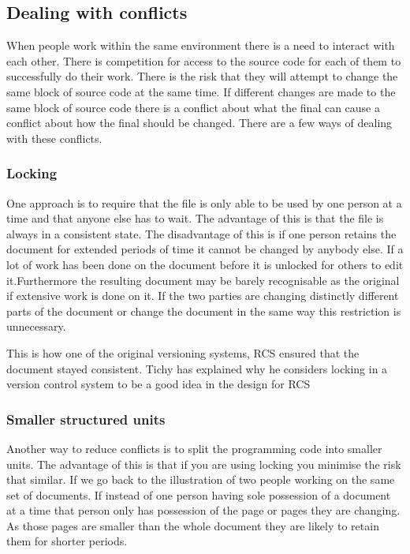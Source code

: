 \subsection{Dealing with conflicts}
When people work within the same environment there is a need to interact with each other.
There is competition for access to the source code for each of them to successfully do their work.
There is the risk that they will attempt to change the same block of source code at the same time.
If different changes are made to the same block of source code there is a conflict about what the final can cause a conflict about how the final should be changed.
There are a few ways of dealing with these conflicts.

\subsubsection{Locking}
One approach is to require that the file is only able to be used by one person at a time and that anyone else has to wait. The advantage of this is that the file is always in a consistent state. The disadvantage of this is if one person retains the document for extended periods of time it cannot be changed by anybody else. If a lot of work has been done on the document before it is unlocked for others to edit it.Furthermore the resulting document may be barely recognisable as the original if extensive work is done on it. If the two parties are changing distinctly different parts of the document or change the document in the same way this restriction is unnecessary.

This is how one of the original versioning systems, RCS ensured that the document stayed consistent. Tichy has explained why he considers locking in a version control system to be a good idea in the design for RCS\cite{Tichy1982}

\subsubsection{Smaller structured units}
Another way to reduce conflicts is to split the programming code into smaller units.  The advantage of this is that if you are using locking you minimise the risk that similar. If we go back to the illustration of two people working on the same set of documents.  If instead of one person having sole possession of a document at a time that person only has possession of the page or pages they are changing. As those pages are smaller than the whole document they are likely to retain them for shorter periods.
